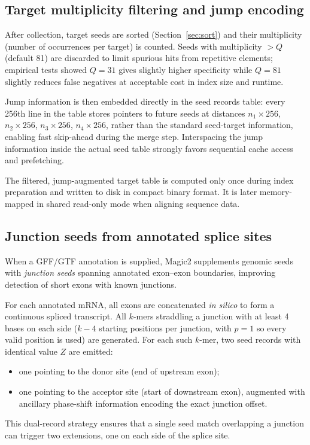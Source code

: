 \documentclass[11pt]{article}
\begin{document}
\subsection{Target multiplicity filtering and jump encoding}
\label{sec:multiplicity}

After collection, target seeds are sorted (Section~\ref{sec:sort}) and their
multiplicity (number of occurrences per target) is counted.
Seeds with multiplicity $> Q$ (default 81) are discarded to limit
spurious hits from repetitive elements; empirical tests showed $Q = 31$
gives slightly higher specificity while $Q = 81$ slightly reduces false negatives
at acceptable cost in index size and runtime.

Jump information is then embedded directly in the seed records table: every
256th line in the table stores pointers to future seeds at distances
$n_1 \times 256$, $n_2 \times 256$, $n_3 \times 256$, $n_4 \times 256$,
rather than the standard seed-target information, enabling
fast skip-ahead during the merge step. Interspacing the jump information
inside the actual seed table strongly favors sequential cache access and prefetching.

The filtered, jump-augmented target table is computed only once
during index preparation and written to disk in compact binary
format. It is later memory-mapped in shared read-only mode
when aligning sequence data.

\subsection{Junction seeds from annotated splice sites}
\label{sec:junction_seeds}

When a GFF/GTF annotation is supplied, Magic2 supplements genomic seeds
with \emph{junction seeds} spanning annotated exon--exon boundaries,
improving detection of short exons with known junctions.

For each annotated mRNA, all exons are concatenated \textit{in silico}
to form a continuous spliced transcript.
All $k$-mers straddling a junction with at least 4 bases on each
side ($k - 4$ starting positions per junction, with $p = 1$ so every
valid position is used) are generated.
For each such $k$-mer, two seed records with identical value $Z$ are
emitted:
\begin{itemize}
  \item one pointing to the donor site (end of upstream exon);
  \item one pointing to the acceptor site (start of downstream exon),
        augmented with ancillary phase-shift information encoding the
        exact junction offset.
\end{itemize}
This dual-record strategy ensures that a single seed match overlapping a
junction can trigger two extensions, one on each side of the splice site.
\end{document}
